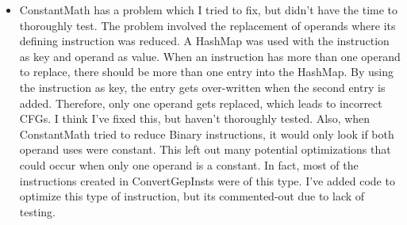 \begin{itemize}
\item ConstantMath has a problem which I tried to fix, but didn't have
  the time to thoroughly test.  The problem involved the replacement
  of operands where its defining instruction was reduced.  A HashMap
  was used with the instruction as key and operand as value.  When an
  instruction has more than one operand to replace, there should be
  more than one entry into the HashMap.  By using the instruction as
  key, the entry gets over-written when the second entry is added.
  Therefore, only one operand gets replaced, which leads to incorrect
  CFGs.  I think I've fixed this, but haven't thoroughly tested.
  Also, when ConstantMath tried to reduce Binary instructions, it
  would only look if both operand uses were constant.  This left out
  many potential optimizations that could occur when only one operand
  is a constant. In fact, most of the instructions created in
  ConvertGepInsts were of this type.  I've added code to optimize this
  type of instruction, but its commented-out due to lack of testing.

\end{itemize}